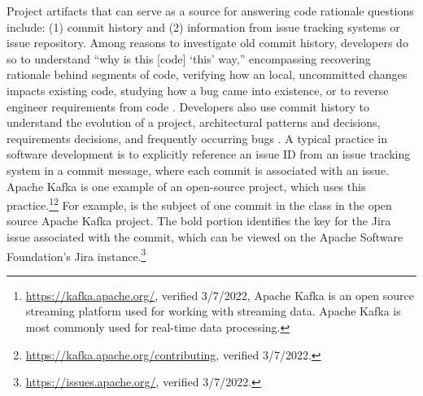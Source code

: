 Project artifacts that can serve as a source for answering code rationale questions include: (1) commit history and (2) information from issue tracking systems or issue repository. 
Among reasons to investigate old commit history, developers do so to understand ``why is this [code] ‘this’ way,'' encompassing recovering rationale behind segments of code, verifying how an local, uncommitted changes impacts existing code, studying how a bug came into existence, or to reverse engineer requirements from code \cite{codoban_software_2015}. 
Developers also use commit history to understand the evolution of a project, \eg  architectural patterns and decisions, requirements decisions, and frequently occurring bugs \cite{codoban_software_2015}.
A typical practice in software development is to explicitly reference an issue ID from an issue tracking system in a commit message, where each commit is associated with an issue. Apache Kafka is one example of an open-source project, which uses this practice.\footnote{\url{https://kafka.apache.org/}, verified 3/7/2022, Apache Kafka is an open source streaming platform used for working with streaming data. Apache Kafka is most commonly used for real-time data processing.}\footnote{\url{https://kafka.apache.org/contributing}, verified 3/7/2022.}
For example, \colorbox{lightgray}{} is the subject of one commit in the  class in the open source Apache Kafka project. The bold portion identifies the key for the Jira issue associated with the commit, which can be viewed on the Apache Software Foundation's Jira instance.\footnote{\url{https://issues.apache.org/}, verified 3/7/2022.}

